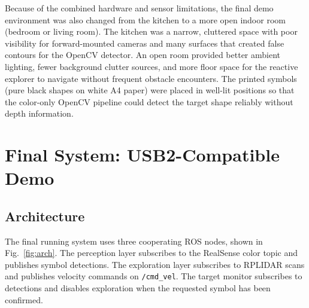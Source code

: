 \documentclass[letterpaper, 10 pt, conference]{ieeeconf/ieeeconf}
\begin{document}
Because of the combined hardware and sensor limitations, the final demo
environment was also changed from the kitchen to a more open indoor room
(bedroom or living room).
The kitchen was a narrow, cluttered space with poor visibility for
forward-mounted cameras and many surfaces that created false contours
for the OpenCV detector.
An open room provided better ambient lighting, fewer background clutter
sources, and more floor space for the reactive explorer to navigate without
frequent obstacle encounters.
The printed symbols (pure black shapes on white A4 paper) were placed in
well-lit positions so that the color-only OpenCV pipeline could detect the
target shape reliably without depth information.

\section{Final System: USB2-Compatible Demo}
\label{sec:final-system}

\subsection{Architecture}

The final running system uses three cooperating ROS nodes, shown in
Fig.~\ref{fig:arch}.
The perception layer subscribes to the RealSense color topic and publishes
symbol detections.
The exploration layer subscribes to RPLIDAR scans and publishes velocity
commands on \texttt{/cmd\_vel}.
The target monitor subscribes to detections and disables exploration when
the requested symbol has been confirmed.
\end{document}
